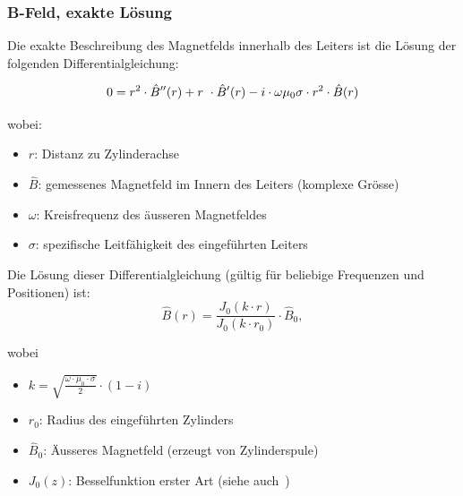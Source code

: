 \subsubsection{B-Feld, exakte L\"osung}
\label{sec:arbgru:subsec:vollzylinder:bFeldexakt}


Die exakte Beschreibung des Magnetfelds innerhalb des Leiters ist die L\"osung der
folgenden Differentialgleichung:

\begin{equation}
    \label{eq:vollzylinder:DLG}
        0 = r^2 \cdot \hat{B}'' (r) + r\ \cdot \hat{B}' (r) - i \cdot \omega\mu_0\sigma \cdot r^2 \cdot \hat{B} (r) \\
\end{equation}

wobei:

\begin{itemize}
    \item[]
        $r$: Distanz zu Zylinderachse
    \item[]
        $\hat{B}$: gemessenes Magnetfeld im Innern des Leiters (komplexe Gr\"osse)
    \item[]
        $\omega$: Kreisfrequenz des \"ausseren Magnetfeldes
    \item[]
        $\sigma$: spezifische Leitf\"ahigkeit des eingef\"uhrten Leiters
\end{itemize}


Die L\"osung dieser Differentialgleichung (g\"ultig f\"ur beliebige Frequenzen und Positionen) ist:
\begin{equation}
    \label{eq:vollzylinder:bFeldExact}
    \hat{B} (r) = \frac{J_0 (k \cdot r)}{J_0 (k \cdot r_0)} \cdot \hat{B}_0,
\end{equation}

wobei
\begin{itemize}
    \item[]
        $k = \sqrt{\frac{\omega \cdot \mu_0 \cdot \sigma}{2}} \cdot (1-i)$
    \item[]
        $r_0$: Radius des eingef\"uhrten Zylinders
    \item[]
        $\hat{B}_0$: \"Ausseres Magnetfeld (erzeugt von Zylinderspule)
    \item[]
        $J_0(z)$: Besselfunktion erster Art (siehe auch~\cite{ref:wikipedia:bessel})
\end{itemize}

